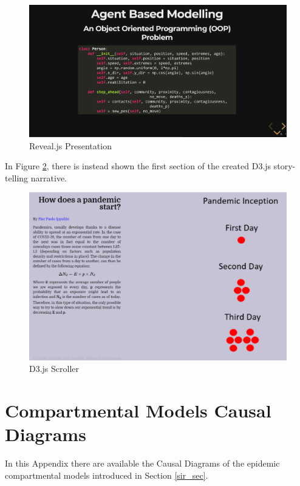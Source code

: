 \begin{appendices}
\begin{figure}[ht!]%
    \centering
    \includegraphics[width=1\linewidth]{latex/images/demo1.pdf}
    \caption{Reveal.js Presentation}
    \label{revealjs_ex}
\end{figure}
\vspace{-0.3cm}
In Figure \ref{d3js_ex}, there is instead shown the first section of the created D3.js story-telling narrative.

\begin{figure}[ht!]%
    \centering
    \includegraphics[width=0.8\linewidth]{latex/images/d3js_demo.pdf}
    \caption{D3.js Scroller}
    \label{d3js_ex}
\end{figure}


\section{Compartmental Models Causal Diagrams}
\label{causal_comp}

In this Appendix there are available the Causal Diagrams of the epidemic compartmental models introduced in Section \ref{sir_sec}.


\end{appendices}
